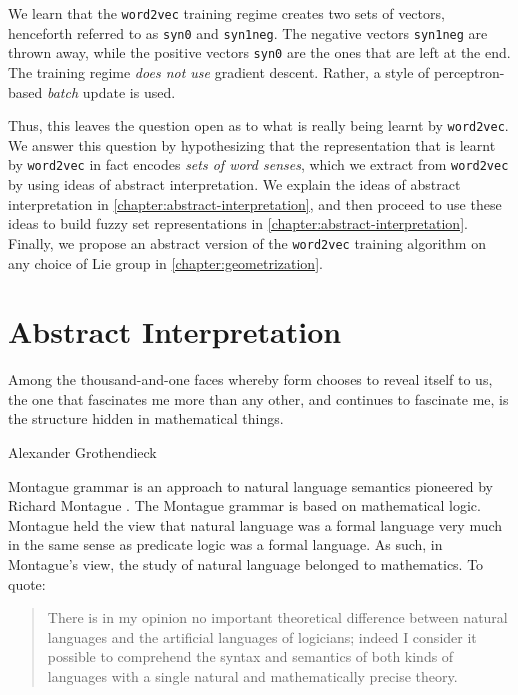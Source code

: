 \documentclass[11pt]{book}
\begin{document}
We learn that the \texttt{word2vec} training regime creates two sets of vectors, henceforth
referred to as \texttt{syn0} and \texttt{syn1neg}. The negative vectors
\texttt{syn1neg} are thrown away, while the positive vectors \texttt{syn0} are
the ones that are left at the end. The training regime \emph{does not use}
gradient descent. Rather, a style of perceptron-based \textit{batch} update is used.

Thus,
this leaves the question open as to what is really being learnt by
\texttt{word2vec}. We answer this question by hypothesizing that the
representation that is learnt by \texttt{word2vec} in fact encodes \emph{sets
of word senses}, which we extract from \texttt{word2vec} by using ideas of
abstract interpretation. We explain the ideas of abstract interpretation in
\autoref{chapter:abstract-interpretation}, and then proceed to use these ideas
to build fuzzy set representations in
\autoref{chapter:abstract-interpretation}. Finally, we propose an abstract
version of the \texttt{word2vec} training algorithm on any choice of Lie group
in \autoref{chapter:geometrization}.

\section{Abstract Interpretation}
\label{chapter:abstract-interpretation}
\epigraph{Among the thousand-and-one faces whereby form chooses to reveal itself to us, the one that fascinates me more than any other, and continues to fascinate me, is the structure hidden in mathematical things.}{Alexander Grothendieck}


Montague grammar is an approach to natural language semantics pioneered by
Richard Montague \cite{sep-montague-semantics}. The Montague grammar is based
on mathematical logic.  Montague held the view that natural language was a
formal language very much in the same sense as predicate logic was a formal
language. As such, in Montague’s view, the study of natural language belonged
to mathematics. To quote:

\begin{quote} There is in my opinion no important theoretical difference
    between natural languages and the artificial languages of logicians; indeed
    I consider it possible to comprehend the syntax and semantics of both kinds
    of languages with a single natural and mathematically precise theory.
\end{quote}
\end{document}
